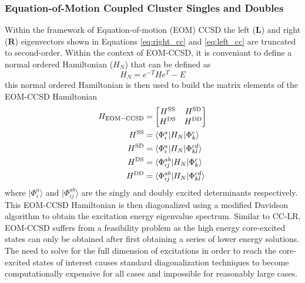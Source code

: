\documentclass[final]{emory}
\begin{document}
\subsubsection{Equation-of-Motion Coupled Cluster Singles and Doubles}
Within the framework of Equation-of-motion (EOM) CCSD the left ($\mathbf{L}$) and right ($\mathbf{R}$) eigenvectors shown in Equations \ref{eq:right_cc} and \ref{eq:left_cc} are truncated to second-order. Within the context of EOM-CCSD, it is conveniant to define a normal ordered Hamiltonian ($H_N$) that can be defined as
\begin{equation}
H_N = e^{-T}He^T - E
\end{equation}
this normal ordered Hamiltonian is then used to build the matrix elements of the EOM-CCSD Hamiltonian 
\begin{align}
\nonumber
H_{\rm EOM-CCSD} &= 
\begin{bmatrix}
H^{\rm SS} & H^{\rm SD} \\
H^{\rm DS} & H^{\rm DD}
\end{bmatrix} \\
\nonumber
H^{\rm SS} &= \langle \Phi_{i}^{a} | H_N | \Phi_{k}^{c} \rangle \\
\nonumber
H^{\rm SD} &= \langle \Phi_{i}^{a} | H_N | \Phi_{kl}^{cd} \rangle \\
\nonumber
H^{\rm DS} &= \langle \Phi_{ij}^{ab} | H_N | \Phi_{k}^{c} \rangle \\
H^{\rm DD} &= \langle \Phi_{ij}^{ab} | H_N | \Phi_{kl}^{cd} \rangle
\end{align}
where $|\Phi_{i}^{a} \rangle$ and $|\Phi_{ij}^{ab} \rangle$ are the singly and doubly excited determinants respectively. This EOM-CCSD Hamiltonian is then diagonalized using a modified Davidson algorithm to obtain the excitation energy eigenvalue spectrum. Similar to CC-LR, EOM-CCSD suffers from a feasibility problem as the high energy core-excited states can only be obtained after first obtaining a series of lower energy solutions. The need to solve for the full dimension of excitations in order to reach the core-excited states of interest causes standard diagonalization techniques to become computationally expensive for all cases and impossible for reasonably large cases.
\end{document}
